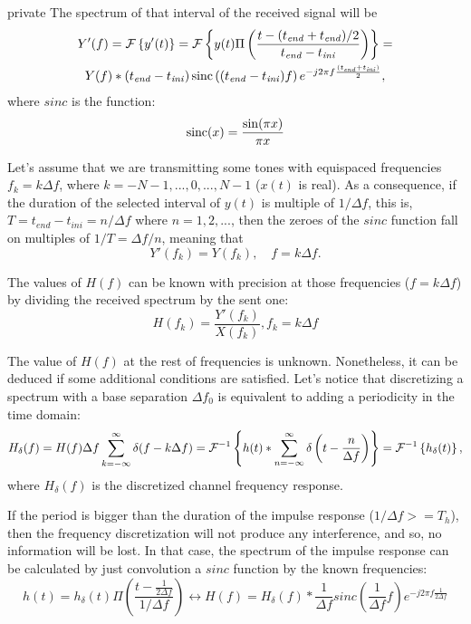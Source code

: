 \begin{shownto}{private}
The spectrum of that interval of the received signal will be
\begin{multline}
Y'(f) = \FourierTransform{y'(t)} = \FourierTransform{y(t) \Pi\left(\frac{t - (t_\mathit{end} + t_\mathit{end})/2}{t_\mathit{end} - t_\mathit{ini}}\right)} = \\ Y(f) \ast (t_\mathit{end} - t_\mathit{ini}) \sinc\left((t_\mathit{end} - t_\mathit{ini}) f \right) e^{-j 2 \pi f \frac{(t_\mathit{end} + t_\mathit{ini})}{2}},
\end{multline}
where $\mathit{sinc}$ is the function:
\begin{equation}
\operatorname{sinc}(x) = \frac{\sin(\pi x)}{\pi x}
\end{equation}

Let's assume that we are transmitting some tones with equispaced frequencies $f_k = k \Delta f$, where $k = -N - 1, ..., 0, ..., N-1$ ($x(t)$ is real). As a consequence, if the duration of the selected interval of $y(t)$ is multiple of $1/\Delta f$, this is, $T = t_\mathit{end} - t_\mathit{ini} = n/\Delta f$ where $n = 1, 2, ...$, then the zeroes of the $\mathit{sinc}$ function fall on multiples of $1/T = \Delta f / n$, meaning that 
\begin{equation}
Y'(f_k) = Y(f_k), \quad f = k \Delta f.
\end{equation}

The values of $H(f)$ can be known with precision at those frequencies ($f = k \Delta f$) by dividing the received spectrum by the sent one:
\begin{equation}
H(f_k) = \frac{Y'(f_k)}{X(f_k)}, f_k = k \Delta f
\label{Hestimate1}
\end{equation}

The value of $H(f)$ at the rest of frequencies is unknown. Nonetheless, it can be deduced if some additional conditions are satisfied. Let's notice that discretizing a spectrum with a base separation $\Delta f_0$ is equivalent to adding a periodicity in the time domain:
\begin{equation}
H_\delta(f) = H(f) \Delta f \sum_{k = -\infty}^{\infty} \delta(f - k \Delta f) = \FourierTransform{h(t) \ast \sum_{n = -\infty}^{\infty} \delta\left(t - \frac{n}{\Delta f}\right)}[inverse] = \FourierTransform{h_\delta(t)}[inverse],
\end{equation}
where $H_\delta(f)$ is the discretized channel frequency response.

If the period is bigger than the duration of the impulse response ($1/\Delta f >= T_h$), then the frequency discretization will not produce any interference, and so, no information will be lost. In that case, the spectrum of the impulse response can be calculated by just convolution a $\mathit{sinc}$ function by the known frequencies:
\begin{equation}
h(t) = h_\delta(t) \Pi\left( \frac{t - \frac{1}{2\Delta f}}{1/\Delta f} \right) \leftrightarrow
H(f) = H_\delta(f) \ast \frac{1}{\Delta f} \mathit{sinc}\left( \frac{1}{\Delta f} f \right) e^{-j 2 \pi f \frac{1}{2 \Delta f}}
\end{equation}


\end{shownto}
